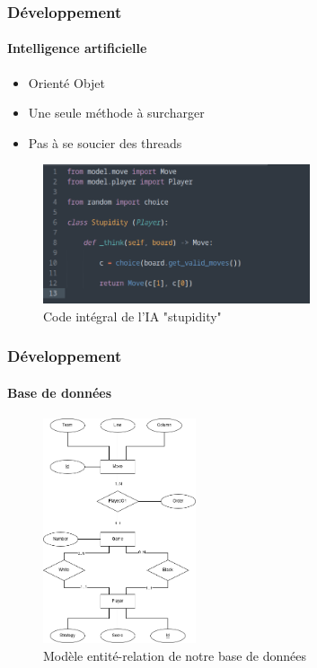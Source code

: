 \begin{frame}
	\frametitle{Développement}
	\framesubtitle{Intelligence artificielle}

	\begin{itemize}
		\item Orienté Objet
		\item Une seule méthode à surcharger
		\item Pas à se soucier des threads
	\end{itemize}

	\begin{figure}[b]
		\includegraphics[width=0.7\textwidth]{img/stupidity.png}
		\caption{Code intégral de l'IA "stupidity"}
	\end{figure}
\end{frame}

\begin{frame}
	\frametitle{Développement}
	\framesubtitle{Base de données}

	\begin{figure}
		\includegraphics[width=0.4\textwidth]{img/entity_relationship.png}
		\caption{Modèle entité-relation de notre base de données}
	\end{figure}
\end{frame}

